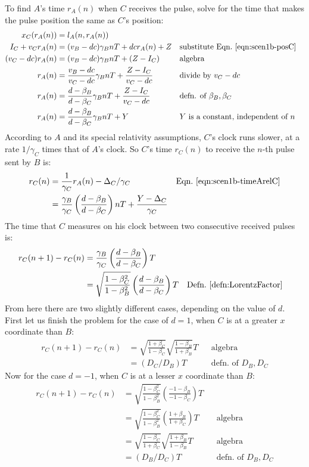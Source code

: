 \documentclass[a4paper]{article}
\theoremstyle{plain}
\theoremstyle{definition}
\begin{document}
To find $A$'s time $r_A(n)$ when $C$ receives the pulse,
solve for the time that makes the pulse position the same as $C$'s position:
\begin{align*}
x_C(r_A(n)) & = l_A(n, r_A(n)) \\
I_C + v_C r_A(n) & = (v_B - dc) \gamma_B nT + dc r_A(n) + Z & & \text{substitute Eqn.~\eqref{eqn:scen1b-posC}} \\
(v_C - dc) r_A(n) & = (v_B - dc) \gamma_B nT + (Z - I_C) & & \text{algebra} \\
r_A(n) & = \frac{v_B - dc}{v_C - dc} \gamma_B nT + \frac{Z - I_C}{v_C - dc} & & \text{divide by $v_C-dc$} \\
r_A(n) & = \frac{d - \beta_B}{d -  \beta_C} \gamma_B nT + \frac{Z - I_C}{v_C - dc} & & \text{defn. of $\beta_B, \beta_C$} \\
r_A(n) & = \frac{d - \beta_B}{d - \beta_C} \gamma_B nT + Y & & \text{$Y$ is a constant, independent of $n$}
\end{align*}
According to $A$ and its special relativity assumptions,
$C$'s clock runs slower, at a rate $1/\gamma_C$ times that of $A$'s clock.
So $C$'s time $r_C(n)$ to receive the $n$-th pulse sent by $B$ is:
\begin{align*}
r_C(n) & = \frac{1}{\gamma_C} r_A(n) - \Delta_C/\gamma_C & & \text{Eqn.~\eqref{eqn:scen1b-timeArelC}} \\
       & = \frac{\gamma_B}{\gamma_C} \left( \frac{d-\beta_B}{d-\beta_C} \right) nT + \frac{Y-\Delta_C}{\gamma_C}
\end{align*}
The time that $C$ measures on his clock between two consecutive received
pulses is:
\begin{align*}
r_C(n+1) - r_C(n)
  & = \frac{\gamma_B}{\gamma_C} \left( \frac{d-\beta_B}{d-\beta_C} \right) T \\
  & = \sqrt{ \frac{1-\beta_C^2}{1-\beta_B^2} } \left( \frac{d-\beta_B}{d-\beta_C} \right) T & & \text{Defn.~\eqref{defn:LorentzFactor}}
\end{align*}
From here there are two slightly different cases, depending on the
value of $d$.  First let us finish the problem for the case of $d=1$,
when $C$ is at a greater $x$ coordinate than $B$:
\begin{align*}
r_C(n+1) - r_C(n)
  & = \sqrt{ \frac{1+\beta_C}{1-\beta_C} } \sqrt { \frac{1-\beta_B}{1+\beta_B} } T & & \text{algebra} \\
  & = ( D_C / D_B ) T & & \text{defn. of $D_B, D_C$}
\end{align*}
Now for the case $d=-1$, when $C$ is at a lesser $x$ coordinate than
$B$:
\begin{align*}
r_C(n+1) - r_C(n)
  & = \sqrt{ \frac{1-\beta_C^2}{1-\beta_B^2} } \left( \frac{-1-\beta_B}{-1-\beta_C} \right) T \\
  & = \sqrt{ \frac{1-\beta_C^2}{1-\beta_B^2} } \left( \frac{1+\beta_B}{1+\beta_C} \right) T & & \text{algebra} \\
  & = \sqrt{ \frac{1-\beta_C}{1+\beta_C} } \sqrt { \frac{1+\beta_B}{1-\beta_B} } T & & \text{algebra} \\
  & = ( D_B / D_C ) T & & \text{defn. of $D_B, D_C$}
\end{align*}
\end{document}

